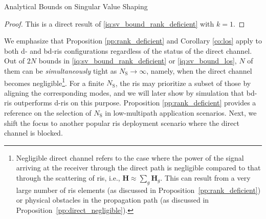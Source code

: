 \begin{section}{Analytical Bounds on Singular Value Shaping}
	\begin{proof}
		This is a direct result of \eqref{iq:sv_bound_rank_deficient} with $k = 1$.
	\end{proof}

	We emphasize that
	Proposition \ref{pp:rank_deficient} and Corollary \ref{co:los} apply to both \gls{d}- and \gls{bd}-\gls{ris} configurations regardless of the status of the direct channel.
	Out of $2N$ bounds in \eqref{iq:sv_bound_rank_deficient} or \eqref{iq:sv_bound_los}, $N$ of them
	can be \emph{simultaneously} tight as $N_\mathrm{S} \to \infty$, namely, when the direct channel becomes negligible\footnote{Negligible direct channel refers to the case where the power of the signal arriving at the receiver through the direct path is negligible compared to that through the scattering of \gls{ris}, i.e., $\mathbf{H} \approx \sum_g \mathbf{H}_g$. This can result from a very large number of \gls{ris} elements (as discussed in Proposition~\ref{pp:rank_deficient}) or physical obstacles in the propagation path (as discussed in Proposition~\ref{pp:direct_negligible}).}.
	For a finite $N_\mathrm{S}$, the \gls{ris} may prioritize a subset of those by aligning the corresponding modes, and we will later show by simulation that \gls{bd}-\gls{ris} outperforms \gls{d}-\gls{ris} on this purpose.
	Proposition \ref{pp:rank_deficient} provides a reference on the selection of $N_\mathrm{S}$ in low-multipath application scenarios.
	Next, we shift the focus to another popular \gls{ris} deployment scenario where the direct channel is blocked.


	\begin{proposition}\label{pp:direct_negligible}


\end{proposition}
\end{section}
